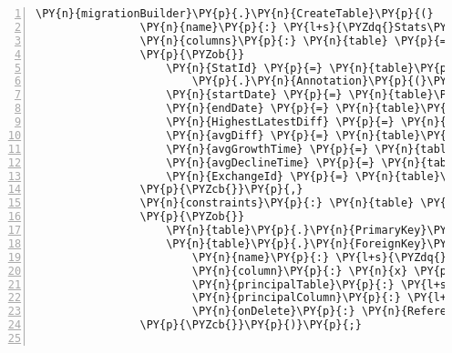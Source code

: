 \begin{Verbatim}[commandchars=\\\{\},numbers=left,firstnumber=1,stepnumber=1,numberblanklines=0]
            \PY{n}{migrationBuilder}\PY{p}{.}\PY{n}{CreateTable}\PY{p}{(}
                \PY{n}{name}\PY{p}{:} \PY{l+s}{\PYZdq{}Stats\PYZdq{}}\PY{p}{,}
                \PY{n}{columns}\PY{p}{:} \PY{n}{table} \PY{p}{=}\PY{p}{\PYZgt{}} \PY{k}{new}
                \PY{p}{\PYZob{}}
                    \PY{n}{StatId} \PY{p}{=} \PY{n}{table}\PY{p}{.}\PY{n}{Column}\PY{p}{\PYZlt{}}\PY{k+kt}{int}\PY{p}{\PYZgt{}}\PY{p}{(}\PY{n}{nullable}\PY{p}{:} \PY{k}{false}\PY{p}{)}
                        \PY{p}{.}\PY{n}{Annotation}\PY{p}{(}\PY{l+s}{\PYZdq{}Sqlite:Autoincrement\PYZdq{}}\PY{p}{,} \PY{k}{true}\PY{p}{)}\PY{p}{,}
                    \PY{n}{startDate} \PY{p}{=} \PY{n}{table}\PY{p}{.}\PY{n}{Column}\PY{p}{\PYZlt{}}\PY{n}{DateTime}\PY{p}{\PYZgt{}}\PY{p}{(}\PY{n}{nullable}\PY{p}{:} \PY{k}{false}\PY{p}{)}\PY{p}{,}
                    \PY{n}{endDate} \PY{p}{=} \PY{n}{table}\PY{p}{.}\PY{n}{Column}\PY{p}{\PYZlt{}}\PY{n}{DateTime}\PY{p}{\PYZgt{}}\PY{p}{(}\PY{n}{nullable}\PY{p}{:} \PY{k}{false}\PY{p}{)}\PY{p}{,}
                    \PY{n}{HighestLatestDiff} \PY{p}{=} \PY{n}{table}\PY{p}{.}\PY{n}{Column}\PY{p}{\PYZlt{}}\PY{k+kt}{decimal}\PY{p}{\PYZgt{}}\PY{p}{(}\PY{n}{nullable}\PY{p}{:} \PY{k}{false}\PY{p}{)}\PY{p}{,}
                    \PY{n}{avgDiff} \PY{p}{=} \PY{n}{table}\PY{p}{.}\PY{n}{Column}\PY{p}{\PYZlt{}}\PY{k+kt}{decimal}\PY{p}{\PYZgt{}}\PY{p}{(}\PY{n}{nullable}\PY{p}{:} \PY{k}{false}\PY{p}{)}\PY{p}{,}
                    \PY{n}{avgGrowthTime} \PY{p}{=} \PY{n}{table}\PY{p}{.}\PY{n}{Column}\PY{p}{\PYZlt{}}\PY{n}{TimeSpan}\PY{p}{\PYZgt{}}\PY{p}{(}\PY{n}{nullable}\PY{p}{:} \PY{k}{false}\PY{p}{)}\PY{p}{,}
                    \PY{n}{avgDeclineTime} \PY{p}{=} \PY{n}{table}\PY{p}{.}\PY{n}{Column}\PY{p}{\PYZlt{}}\PY{n}{TimeSpan}\PY{p}{\PYZgt{}}\PY{p}{(}\PY{n}{nullable}\PY{p}{:} \PY{k}{false}\PY{p}{)}\PY{p}{,}
                    \PY{n}{ExchangeId} \PY{p}{=} \PY{n}{table}\PY{p}{.}\PY{n}{Column}\PY{p}{\PYZlt{}}\PY{k+kt}{int}\PY{p}{\PYZgt{}}\PY{p}{(}\PY{n}{nullable}\PY{p}{:} \PY{k}{false}\PY{p}{)}
                \PY{p}{\PYZcb{}}\PY{p}{,}
                \PY{n}{constraints}\PY{p}{:} \PY{n}{table} \PY{p}{=}\PY{p}{\PYZgt{}}
                \PY{p}{\PYZob{}}
                    \PY{n}{table}\PY{p}{.}\PY{n}{PrimaryKey}\PY{p}{(}\PY{l+s}{\PYZdq{}PK\PYZus{}Stats\PYZdq{}}\PY{p}{,} \PY{n}{x} \PY{p}{=}\PY{p}{\PYZgt{}} \PY{n}{x}\PY{p}{.}\PY{n}{StatId}\PY{p}{)}\PY{p}{;}
                    \PY{n}{table}\PY{p}{.}\PY{n}{ForeignKey}\PY{p}{(}
                        \PY{n}{name}\PY{p}{:} \PY{l+s}{\PYZdq{}FK\PYZus{}Stats\PYZus{}Exchanges\PYZus{}ExchangeId\PYZdq{}}\PY{p}{,}
                        \PY{n}{column}\PY{p}{:} \PY{n}{x} \PY{p}{=}\PY{p}{\PYZgt{}} \PY{n}{x}\PY{p}{.}\PY{n}{ExchangeId}\PY{p}{,}
                        \PY{n}{principalTable}\PY{p}{:} \PY{l+s}{\PYZdq{}Exchanges\PYZdq{}}\PY{p}{,}
                        \PY{n}{principalColumn}\PY{p}{:} \PY{l+s}{\PYZdq{}ExchangeId\PYZdq{}}\PY{p}{,}
                        \PY{n}{onDelete}\PY{p}{:} \PY{n}{ReferentialAction}\PY{p}{.}\PY{n}{Cascade}\PY{p}{)}\PY{p}{;}
                \PY{p}{\PYZcb{}}\PY{p}{)}\PY{p}{;}


\end{Verbatim}
